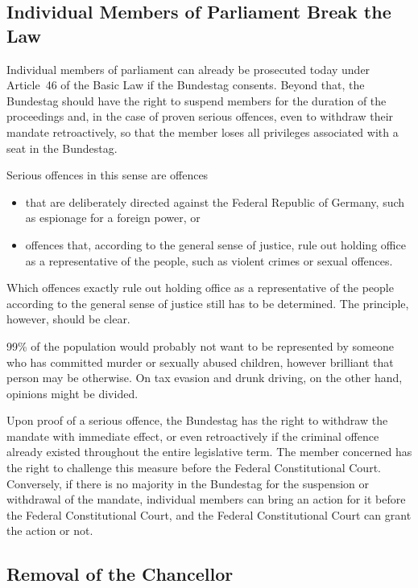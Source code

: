 \subsection{Individual Members of Parliament Break the Law} \label{subsec:mps_breaking_the_law}

Individual members of parliament can already be prosecuted today under Article~46 of the Basic Law if the Bundestag consents.
Beyond that, the Bundestag should have the right to suspend members for the duration of the proceedings and, in the case of
proven serious offences, even to withdraw their mandate retroactively, so that the member loses all privileges
associated with a seat in the Bundestag.

Serious offences in this sense are offences
\begin{itemize}
  \item that are deliberately directed against the Federal Republic of Germany, such as espionage for a foreign power, or
  \item offences that, according to the general sense of justice, rule out holding office as a representative of the people, such as violent crimes or sexual offences.
\end{itemize}

Which offences exactly rule out holding office as a representative of the people according to the general sense of justice still has to be determined.
The principle, however, should be clear.

99\% of the population would probably not want to be represented by someone who has committed murder or sexually abused children, however brilliant that person may be otherwise.
On tax evasion and drunk driving, on the other hand, opinions might be divided.

Upon proof of a serious offence, the Bundestag has the right to withdraw the mandate with immediate effect, or even retroactively if the criminal offence already existed throughout the entire
legislative term.
The member concerned has the right to challenge this measure before the Federal Constitutional Court.
Conversely, if there is no majority in the Bundestag for the suspension or withdrawal of the mandate, individual members can bring an action for it before the Federal Constitutional Court, and the
Federal Constitutional Court can grant the action or not.

\subsection{Removal of the Chancellor}

